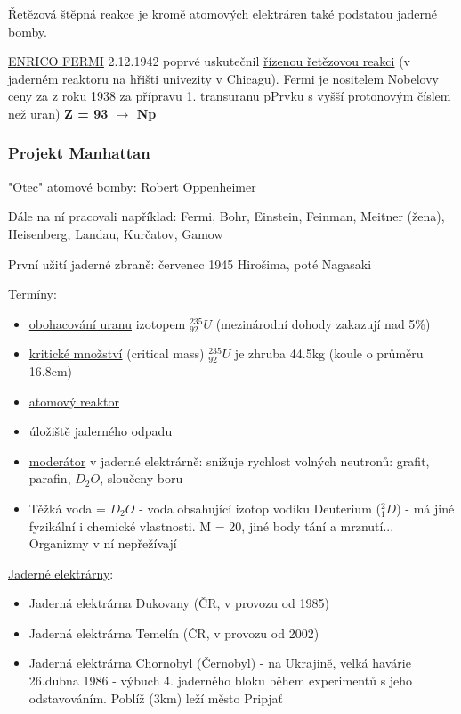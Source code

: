 Řetězová štěpná reakce je kromě atomových elektráren také podstatou jaderné bomby.

\vspace{1em}

\underline{ENRICO FERMI} 2.12.1942 poprvé uskutečnil \underline{řízenou řetězovou reakci} (v jaderném reaktoru na hřišti univezity v Chicagu).
Fermi je nositelem Nobelovy ceny za z roku 1938 za přípravu 1. transuranu pPrvku s vyšší protonovým číslem než uran) \textbf{Z = 93 $\rightarrow$ Np}

\subsubsection{Projekt Manhattan}
"Otec" atomové bomby: Robert Oppenheimer

Dále na ní pracovali například: Fermi, Bohr, Einstein, Feinman, Meitner (žena), Heisenberg, Landau, Kurčatov, Gamow 

První užití jaderné zbraně: červenec 1945 Hirošima, poté Nagasaki

\vspace{1em}
\underline{Termíny}:
\begin{itemize}
    \item \underline{obohacování uranu} izotopem $^{235}_{92}U$ (mezinárodní dohody zakazují nad 5\%)
    \item \underline{kritické množství} (critical mass) $^{235}_{92}U$ je zhruba 44.5kg (koule o průměru 16.8cm)
    \item \underline{atomový reaktor}
    \item úložiště jaderného odpadu
    \item \underline{moderátor} v jaderné elektrárně: snižuje rychlost volných neutronů: grafit, parafin, $D_2O$, sloučeny boru
    \item Těžká voda = $D_2O$ - voda obsahující izotop vodíku Deuterium ($^2_1D$) - má jiné fyzikální i chemické vlastnosti. M = 20, jiné body tání a mrznutí... Organizmy v ní nepřežívají
\end{itemize}

\underline{Jaderné elektrárny}:
\begin{itemize}
    \item Jaderná elektrárna Dukovany (ČR, v provozu od 1985)
    \item Jaderná elektrárna Temelín (ČR, v provozu od 2002)
    
    \item Jaderná elektrárna Chornobyl (Černobyl) - na Ukrajině, velká havárie 26.dubna 1986 - výbuch 4. jaderného bloku během experimentů s jeho odstavováním.
    Poblíž (3km) leží město Pripjať
\end{itemize}

